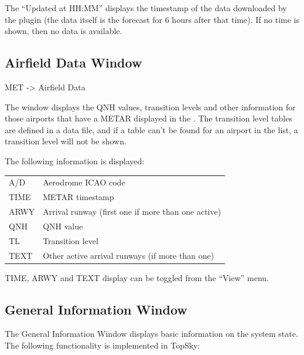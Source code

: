 \documentclass[a4paper,oneside,11pt]{memoir}
\begin{document}
\bigskip

The “Updated at HH:MM” displays the timestamp of the data downloaded by the plugin (the data itself is the forecast for 6 hours after that time). If no time is shown, then no data is available.

\subsection{Airfield Data Window}\label{win:adw}

 MET -> Airfield Data


The window displays the QNH values, transition levels and other information for those airports that have a METAR displayed in the . The transition level tables are defined in a data file, and if a table can’t be found for an airport in the list, a transition level will not be shown.

\bigskip

The following information is displayed:

\begin{longtable}{p{2.5cm} p{10cm}}
  A/D   & Aerodrome ICAO code\\
  TIME  & METAR timestamp\\
  ARWY  & Arrival runway (first one if more than one active)\\
  QNH   & QNH value\\
  TL    & Transition level\\
  TEXT  & Other active arrival runways (if more than one)\\
\end{longtable}

TIME, ARWY and TEXT display can be toggled from the “View” menu.

\subsection{General Information Window}\label{win:geninfo}


The General Information Window displays basic information on the system state. The following functionality is implemented in TopSky:
\end{document}
